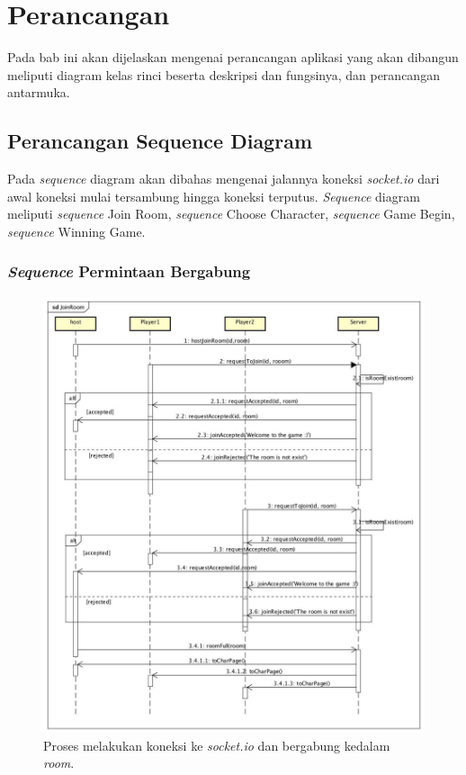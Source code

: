 \chapter{Perancangan}
\label{chap:perancangan}

Pada bab ini akan dijelaskan mengenai perancangan aplikasi yang akan dibangun meliputi diagram kelas rinci beserta deskripsi dan fungsinya, dan perancangan antarmuka.

\section{Perancangan Sequence Diagram}

Pada \textit{sequence} diagram akan dibahas mengenai jalannya koneksi \textit{socket.io} dari awal koneksi mulai tersambung hingga koneksi terputus. \textit{Sequence} diagram meliputi \textit{sequence} Join Room, \textit{sequence} Choose Character, \textit{sequence} Game Begin, \textit{sequence} Winning Game.

\subsection{\textit{Sequence} Permintaan Bergabung}

\begin{figure}[H]
	\centering
	\includegraphics[scale=0.25]{Gambar/JoinRoom}
	\caption{Proses melakukan koneksi ke \textit{socket.io} dan bergabung kedalam \textit{room}.}
	\label{fig:1_JoinRoom}
\end{figure}

